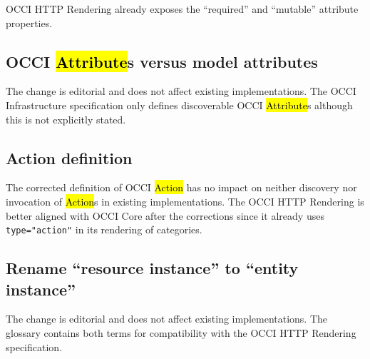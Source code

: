 \documentclass[10pt,a4paper]{article}
\begin{document}
OCCI HTTP Rendering \cite{occi:http_rendering} already exposes the ``required'' and
``mutable'' attribute properties.

\subsection{OCCI \hl{Attribute}s versus model attributes}

The change is editorial and does not affect existing implementations.
%
The OCCI Infrastructure \cite{occi:infrastructure} specification only defines
discoverable OCCI \hl{Attribute}s although this is not explicitly stated.

\subsection{Action definition}

The corrected definition of OCCI \hl{Action} has no impact on neither discovery
nor invocation of \hl{Action}s in existing implementations. The OCCI HTTP Rendering
\cite{occi:http_rendering} is better aligned with OCCI Core after the corrections
since it already uses {\tt type="action"} in its rendering of categories.

\subsection{Rename ``resource instance'' to ``entity instance''}

The change is editorial and does not affect existing implementations.
%
The glossary contains both terms for compatibility with the OCCI HTTP Rendering
\cite{occi:http_rendering} specification.
\end{document}
